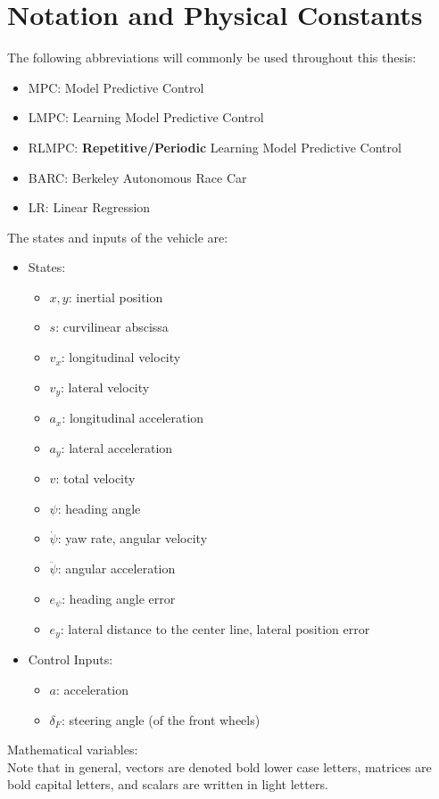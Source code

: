 \chapter*{Notation and Physical Constants}
The following abbreviations will commonly be used throughout this thesis:
\begin{itemize}
	\item MPC: Model Predictive Control
	\item LMPC: Learning Model Predictive Control
	\item RLMPC: {\bfseries{Repetitive/Periodic}} Learning Model Predictive Control
	\item BARC: Berkeley Autonomous Race Car
	\item LR: Linear Regression
\end{itemize}
The states and inputs of the vehicle are:
\begin{itemize}
	\item States:
	\begin{itemize}
		\item $x,y$: inertial position
		\item $s$: curvilinear abscissa
		\item $v_x$: longitudinal velocity
		\item $v_y$: lateral velocity
		\item $a_x$: longitudinal acceleration
		\item $a_y$: lateral acceleration
		\item $v$: total velocity
		\item $\psi$: heading angle
		\item $\dot \psi$: yaw rate, angular velocity
		\item $\ddot \psi$: angular acceleration
		\item $e_\psi$: heading angle error
		\item $e_y$: lateral distance to the center line, lateral position error
	\end{itemize}
	\item Control Inputs:
	\begin{itemize}
		\item $ a$: acceleration
		\item $\delta_F$: steering angle (of the front wheels)	
	\end{itemize}
\end{itemize}
Mathematical variables:\\
Note that in general, vectors are denoted bold lower case letters, matrices are bold capital  letters, and scalars are written in light letters.
